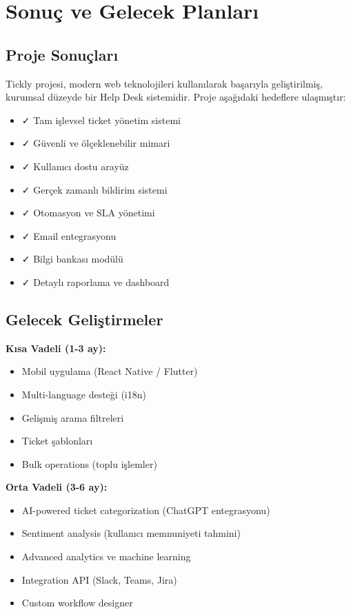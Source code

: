\documentclass[12pt,a4paper]{article}
\begin{document}
\newpage

\section{Sonuç ve Gelecek Planları}

\subsection{Proje Sonuçları}

Tickly projesi, modern web teknolojileri kullanılarak başarıyla geliştirilmiş, kurumsal düzeyde bir Help Desk sistemidir. Proje aşağıdaki hedeflere ulaşmıştır:

\begin{itemize}
    \item ✓ Tam işlevsel ticket yönetim sistemi
    \item ✓ Güvenli ve ölçeklenebilir mimari
    \item ✓ Kullanıcı dostu arayüz
    \item ✓ Gerçek zamanlı bildirim sistemi
    \item ✓ Otomasyon ve SLA yönetimi
    \item ✓ Email entegrasyonu
    \item ✓ Bilgi bankası modülü
    \item ✓ Detaylı raporlama ve dashboard
\end{itemize}

\subsection{Gelecek Geliştirmeler}

\textbf{Kısa Vadeli (1-3 ay):}
\begin{itemize}
    \item Mobil uygulama (React Native / Flutter)
    \item Multi-language desteği (i18n)
    \item Gelişmiş arama filtreleri
    \item Ticket şablonları
    \item Bulk operations (toplu işlemler)
\end{itemize}

\textbf{Orta Vadeli (3-6 ay):}
\begin{itemize}
    \item AI-powered ticket categorization (ChatGPT entegrasyonu)
    \item Sentiment analysis (kullanıcı memnuniyeti tahmini)
    \item Advanced analytics ve machine learning
    \item Integration API (Slack, Teams, Jira)
    \item Custom workflow designer
\end{itemize}
\end{document}

